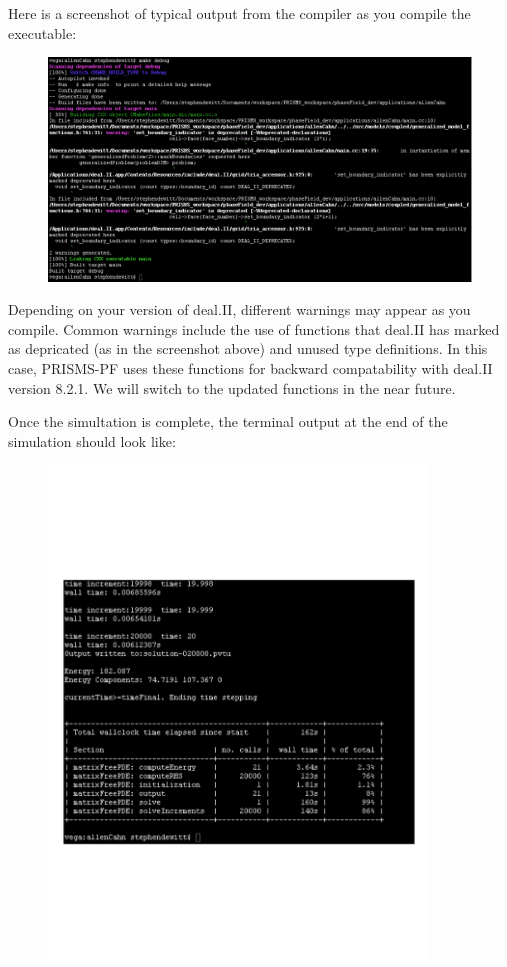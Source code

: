 \documentclass[10pt]{article} %
\begin{document}
Here is a screenshot of typical output from the compiler as you compile the executable:
\begin{figure}[H]
\vspace{0pt}
\hspace{-2cm}
\includegraphics[width=1.3\textwidth]{compile_output}
\vspace{0pt}
\end{figure}
Depending on your version of deal.II, different warnings may appear as you compile. Common warnings include the use of functions that deal.II has marked as depricated (as in the screenshot above) and unused type definitions. In this case, PRISMS-PF uses these functions for backward compatability with deal.II version 8.2.1. We will switch to the updated functions in the near future.

Once the simultation is complete, the terminal output at the end of the simulation should look like:
\begin{figure}[H]
\vspace{-60pt}
\centering
\includegraphics[width=0.9\textwidth]{allenCahn_output}
\vspace{-60pt}
\end{figure}
\end{document}
